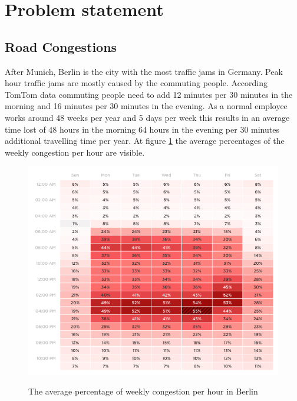 \section{Problem statement} \label{sec:problems}
\subsection{Road Congestions}
After Munich, Berlin is the city with the most traffic jams in Germany. Peak hour traffic jams are mostly caused by the commuting people. According TomTom \cite{tomtom} data commuting people need to add 12 minutes per 30 minutes in the morning and 16 minutes per 30 minutes in the evening. As a normal employee works around 48 weeks per year and 5 days per week this results in an average time lost of 48 hours in the morning 64 hours in the evening per 30 minutes additional travelling time per year. At figure \ref{averageCongestion} the average percentages of the weekly congestion per hour are visible.

\begin{figure}[h!]
	\centering
	\includegraphics[width=0.55\textheight]{ProblemsFigures/TOMTOMWeeklyAverageCongestion}
	\label{averageCongestion}
	\caption{The average percentage of weekly congestion per hour in Berlin }
\end{figure}

